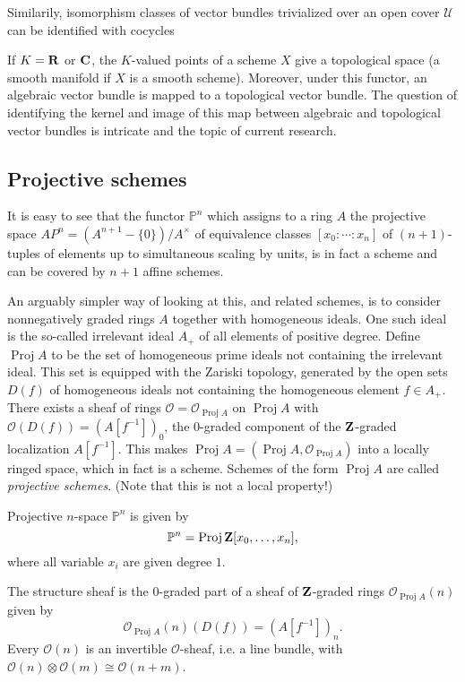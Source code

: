 \documentclass[a4paper,openany]{scrbook}
\DeclareMathOperator{\Proj}{Proj}
\newcommand{\Reg}[1]{\mathcal O_{#1}}
\begin{document}
Similarily, isomorphism classes of vector bundles trivialized over an open cover $\mathcal U$ can be identified with cocycles 

\begin{remark}
If $K=\mathbf R$ or $\mathbf C$, the $K$-valued points of a scheme $X$ give a topological space (a smooth manifold if $X$ is a smooth scheme). Moreover, under this functor, an algebraic vector bundle is mapped to a topological vector bundle. The question of identifying the kernel and image of this map between algebraic and topological vector bundles is intricate and the topic of current research.
\end{remark}

\subsection{Projective schemes} \label{subsec:projectiveschemes}

It is easy to see that the functor $\mathbb P^n$ which assigns to a ring $A$ the projective space $AP^n = (A^{n+1}-\{0\})/A^\times$ of equivalence classes $[x_0:\cdots:x_n]$ of $(n+1)$-tuples of elements up to simultaneous scaling by units, is in fact a scheme and can be covered by $n+1$ affine schemes.

An arguably simpler way of looking at this, and related schemes, is to consider nonnegatively graded rings $A$ together with homogeneous ideals. One such ideal is the so-called irrelevant ideal $A_+$ of all elements of positive degree. Define $\Proj A$ to be the set of homogeneous prime ideals not containing the irrelevant ideal. This set is equipped with the Zariski topology, generated by the open sets $D(f)$ of homogeneous ideals not containing the homogeneous element $f \in A_+$. There exists a sheaf of rings $\mathcal O=\Reg{\Proj A}$ on $\Proj A$ with $\mathcal O(D(f)) = (A[f^{-1}])_0$, the $0$-graded component of the $\mathbf Z$-graded localization $A[f^{-1}]$. This makes $\Proj A = (\Proj A,\Reg{\Proj A})$ into a locally ringed space, which in fact is a scheme. Schemes of the form $\Proj A$ are called \emph{projective schemes}. (Note that this is not a local property!)

\begin{example}
Projective $n$-space $\mathbb P^n$ is given by
\[
\mathbb P^n = \Proj \Z[x_0,\dots,x_n],
\]
where all variable $x_i$ are given degree $1$.
\end{example}

The structure sheaf is the $0$-graded part of a sheaf of $\mathbf Z$-graded rings
$\Reg{\Proj A}(n)$ given by
\[
\Reg{\Proj A}(n)(D(f)) = (A[f^{-1}])_n.
\]
Every $\mathcal O(n)$ is an invertible $\mathcal O$-sheaf, i.e. a line bundle, with $\mathcal O(n) \otimes \mathcal O(m) \cong \mathcal O(n+m)$.
\end{document}
